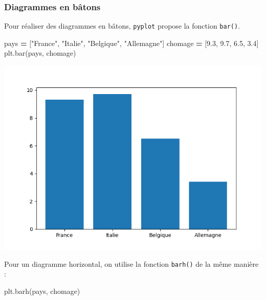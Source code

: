 \documentclass[
  12pt,
]{book}
\newenvironment{Shaded}{\begin{snugshade}}{\end{snugshade}}
\newcommand{\FloatTok}[1]{\textcolor[rgb]{0.00,0.00,0.81}{#1}}
\newcommand{\NormalTok}[1]{#1}
\newcommand{\OperatorTok}[1]{\textcolor[rgb]{0.81,0.36,0.00}{\textbf{#1}}}
\newcommand{\StringTok}[1]{\textcolor[rgb]{0.31,0.60,0.02}{#1}}
\numberwithin{equation}{section}
\numberwithin{countremarque}{section}
\begin{document}
\subsubsection{Diagrammes en bâtons}\label{diagrammes-en-buxe2tons}

Pour réaliser des diagrammes en bâtons, \texttt{pyplot} propose la fonction \texttt{bar()}.

\begin{Shaded}
\begin{Highlighting}[]
\NormalTok{pays }\OperatorTok{=}\NormalTok{ [}\StringTok{"France"}\NormalTok{, }\StringTok{"Italie"}\NormalTok{, }\StringTok{"Belgique"}\NormalTok{, }\StringTok{"Allemagne"}\NormalTok{]}
\NormalTok{chomage }\OperatorTok{=}\NormalTok{ [}\FloatTok{9.3}\NormalTok{, }\FloatTok{9.7}\NormalTok{, }\FloatTok{6.5}\NormalTok{, }\FloatTok{3.4}\NormalTok{]}
\NormalTok{plt.bar(pays, chomage)}
\end{Highlighting}
\end{Shaded}

\begin{center}\includegraphics[width=9.03in]{figs/pyplot/barplot} \end{center}

Pour un diagramme horizontal, on utilise la fonction \texttt{barh()} de la même manière :

\begin{Shaded}
\begin{Highlighting}[]
\NormalTok{plt.barh(pays, chomage)}
\end{Highlighting}
\end{Shaded}
\end{document}
